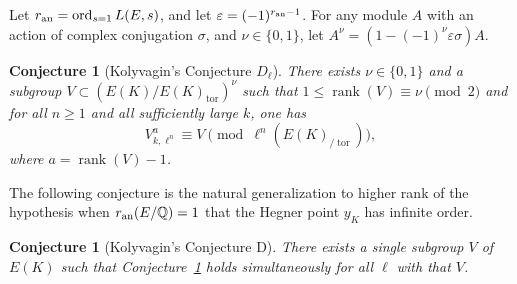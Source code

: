\documentclass{oupau}
\DeclareMathOperator{\ord}{ord}
\DeclareMathOperator{\rank}{rank}
\DeclareMathOperator{\tor}{tor}
\newcommand{\an}{{\rm an}}
\newcommand{\QQ}{\mathbb{Q}}
\newtheorem{conjecture}[theorem]{Conjecture}
\begin{document}
Let $r_{\an} = \ord_{s=1} L(E,s)$, and let $\varepsilon = (-1)^{r_{\an}-1}$. 
For any module $A$ with an action of complex conjugation $\sigma$,
and $\nu\in\{0,1\}$, let $A^\nu = (1-(-1)^\nu \varepsilon \sigma)A$.

\begin{conjecture}[Kolyvagin's Conjecture $D_{\ell}$]\label{conj:D} 
  There exists $\nu\in\{0,1\}$ and a subgroup $V\subset
  (E(K)/E(K)_{\tor})^{\nu}$ such that $1\leq \rank(V) \equiv \nu
  \pmod{2}$ and for all $n\geq 1$ and all sufficiently large $k$, one has
  $$
 V_{k,\ell^n}^a \equiv V\pmod{\ell^n (E(K)_{/\tor})},
$$ 
   where $a = \rank(V)-1$.
\end{conjecture}

The following conjecture is the natural generalization to higher rank
of the hypothesis when $r_{\an}(E/\QQ)=1$ that the Hegner point $y_K$
has infinite order.
\begin{conjecture}[Kolyvagin's Conjecture D]\label{conj:univD}
  There exists a single subgroup $V$ of $E(K)$ such that
  Conjecture~\ref{conj:D} holds simultaneously for all $\ell$ with
  that $V$.
\end{conjecture}
\end{document}
